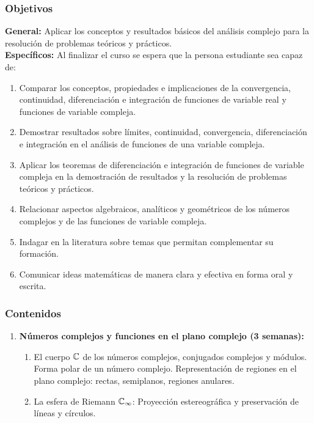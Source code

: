 \begin{refsection}
\subsubsection*{Objetivos}

\textbf{General:} Aplicar los conceptos y resultados básicos del análisis complejo para la resolución de problemas teóricos y prácticos. \\

\textbf{Específicos:} Al finalizar el curso se espera que la persona estudiante sea capaz de:

\begin{enumerate}
\item Comparar los conceptos, propiedades e implicaciones de la convergencia, continuidad, diferenciación e integración de funciones de variable real y funciones de variable compleja.
\item Demostrar resultados sobre límites, continuidad, convergencia, diferenciación e integración en el análisis de funciones de una variable compleja.
\item Aplicar los teoremas de diferenciación e integración de funciones de variable compleja en la demostración de resultados y la resolución de problemas teóricos y prácticos.
\item Relacionar aspectos algebraicos, analíticos y geométricos de los números complejos y de las funciones de variable compleja.
\item Indagar en la literatura sobre temas que permitan complementar su formación.
\item Comunicar ideas matemáticas de manera clara y efectiva en forma oral y escrita.
\end{enumerate}

\subsubsection*{Contenidos}

\begin{enumerate}
\item \textbf{Números complejos y funciones en el plano complejo (3 semanas):} 
\begin{enumerate}
    \item El cuerpo $\mathbb{C}$ de los números complejos, conjugados complejos y módulos. Forma polar de un número complejo. Representación de regiones en el plano complejo: rectas, semiplanos, regiones anulares.

    \item La esfera de Riemann $\mathbb{C}_{\infty}$: Proyección estereográfica y preservación de líneas y círculos.


\end{enumerate}
\end{enumerate}
\end{refsection}
